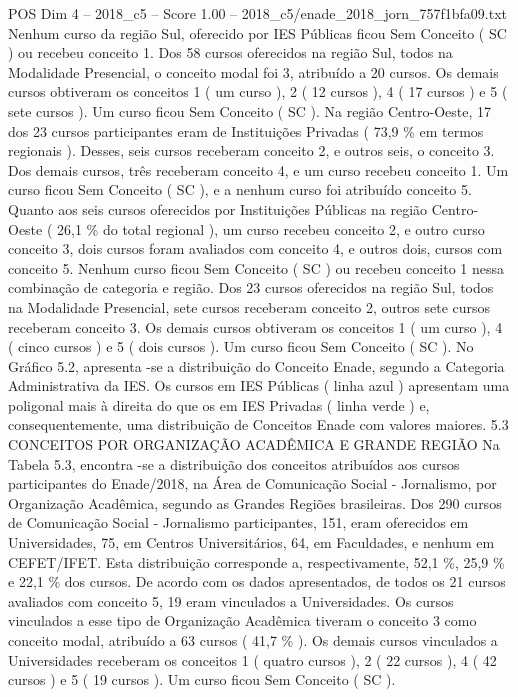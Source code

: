 \begin{textsample}{POS Dim 4 – 2018\_c5 – Score 1.00 – 2018\_c5/enade\_2018\_jorn\_757f1bfa09.txt}
Nenhum curso da região Sul, oferecido por IES Públicas ficou Sem Conceito ( SC ) ou recebeu conceito 1.
Dos 58 cursos oferecidos na região Sul, todos na Modalidade Presencial, o conceito modal foi 3, atribuído a 20 cursos.
Os demais cursos obtiveram os conceitos 1 ( um curso ), 2 ( 12 cursos ), 4 ( 17 cursos ) e 5 ( sete cursos ).
Um curso ficou Sem Conceito ( SC ).
Na região Centro-Oeste, 17 dos 23 cursos participantes eram de Instituições Privadas ( 73,9 \% em termos regionais ).
Desses, seis cursos receberam conceito 2, e outros seis, o conceito 3.
Dos demais cursos, três receberam conceito 4, e um curso recebeu conceito 1.
Um curso ficou Sem Conceito ( SC ), e a nenhum curso foi atribuído conceito 5.
Quanto aos seis cursos oferecidos por Instituições Públicas na região Centro-Oeste ( 26,1 \% do total regional ), um curso recebeu conceito 2, e outro curso conceito 3, dois cursos foram avaliados com conceito 4, e outros dois, cursos com conceito 5.
Nenhum curso ficou Sem Conceito ( SC ) ou recebeu conceito 1 nessa combinação de categoria e região.
Dos 23 cursos oferecidos na região Sul, todos na Modalidade Presencial, sete cursos receberam conceito 2, outros sete cursos receberam conceito 3.
Os demais cursos obtiveram os conceitos 1 ( um curso ), 4 ( cinco cursos ) e 5 ( dois cursos ).
Um curso ficou Sem Conceito ( SC ).
No Gráfico 5.2, apresenta -se a distribuição do Conceito Enade, segundo a Categoria Administrativa da IES.
Os cursos em IES Públicas ( linha azul ) apresentam uma poligonal mais à direita do que os em IES Privadas ( linha verde ) e, consequentemente, uma distribuição de Conceitos Enade com valores maiores. 5.3 CONCEITOS POR ORGANIZAÇÃO ACADÊMICA E GRANDE REGIÃO Na Tabela 5.3, encontra -se a distribuição dos conceitos atribuídos aos cursos participantes do Enade/2018, na Área de Comunicação Social - Jornalismo, por Organização Acadêmica, segundo as Grandes Regiões brasileiras.
Dos 290 cursos de Comunicação Social - Jornalismo participantes, 151, eram oferecidos em Universidades, 75, em Centros Universitários, 64, em Faculdades, e nenhum em CEFET/IFET.
Esta distribuição corresponde a, respectivamente, 52,1 \%, 25,9 \% e 22,1 \% dos cursos.
De acordo com os dados apresentados, de todos os 21 cursos avaliados com conceito 5, 19 eram vinculados a Universidades.
Os cursos vinculados a esse tipo de Organização Acadêmica tiveram o conceito 3 como conceito modal, atribuído a 63 cursos ( 41,7 \% ).
Os demais cursos vinculados a Universidades receberam os conceitos 1 ( quatro cursos ), 2 ( 22 cursos ), 4 ( 42 cursos ) e 5 ( 19 cursos ).
Um curso ficou Sem Conceito ( SC ).

\end{textsample}
